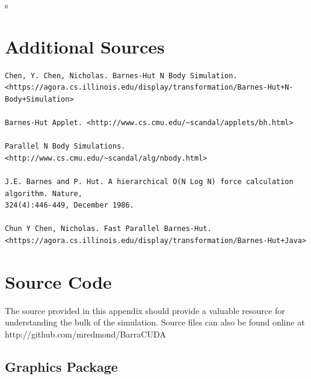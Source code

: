 s\documentclass[10pt]{article}
\begin{document}
\clearpage
\section{Additional Sources}
\begin{verbatim}
Chen, Y. Chen, Nicholas. Barnes-Hut N Body Simulation. 
<https://agora.cs.illinois.edu/display/transformation/Barnes-Hut+N-Body+Simulation>

Barnes-Hut Applet. <http://www.cs.cmu.edu/~scandal/applets/bh.html>

Parallel N Body Simulations. <http://www.cs.cmu.edu/~scandal/alg/nbody.html>

J.E. Barnes and P. Hut. A hierarchical O(N Log N) force calculation algorithm. Nature,
324(4):446-449, December 1986.

Chun Y Chen, Nicholas. Fast Parallel Barnes-Hut. <https://agora.cs.illinois.edu/display/transformation/Barnes-Hut+Java>
\end{verbatim}

\clearpage
\appendix
\section{Source Code}
The source provided in this appendix should provide a valuable resource for understanding the bulk of the simulation. Source files can also be found online at http://github.com/mredmond/BarraCUDA

\subsection{Graphics Package}
\end{document}

